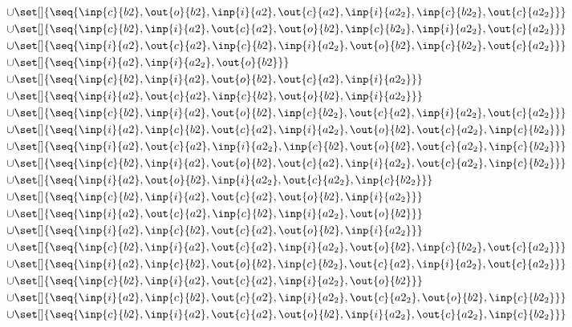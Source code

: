 \begin{align*}
\cup&\set[]{\seq{\inp{c}{b2},\out{o}{b2},\inp{i}{a2},\out{c}{a2},\inp{i}{a2_2},\inp{c}{b2_2},\out{c}{a2_2}}}\\
\cup&\set[]{\seq{\inp{c}{b2},\inp{i}{a2},\out{c}{a2},\out{o}{b2},\inp{c}{b2_2},\inp{i}{a2_2},\out{c}{a2_2}}}\\
\cup&\set[]{\seq{\inp{i}{a2},\out{c}{a2},\inp{c}{b2},\inp{i}{a2_2},\out{o}{b2},\inp{c}{b2_2},\out{c}{a2_2}}}\\
\cup&\set[]{\seq{\inp{i}{a2},\inp{i}{a2_2},\out{o}{b2}}}\\
\cup&\set[]{\seq{\inp{c}{b2},\inp{i}{a2},\out{o}{b2},\out{c}{a2},\inp{i}{a2_2}}}\\
\cup&\set[]{\seq{\inp{i}{a2},\out{c}{a2},\inp{c}{b2},\out{o}{b2},\inp{i}{a2_2}}}\\
\cup&\set[]{\seq{\inp{c}{b2},\inp{i}{a2},\out{o}{b2},\inp{c}{b2_2},\out{c}{a2},\inp{i}{a2_2},\out{c}{a2_2}}}\\
\cup&\set[]{\seq{\inp{i}{a2},\inp{c}{b2},\out{c}{a2},\inp{i}{a2_2},\out{o}{b2},\out{c}{a2_2},\inp{c}{b2_2}}}\\
\cup&\set[]{\seq{\inp{i}{a2},\out{c}{a2},\inp{i}{a2_2},\inp{c}{b2},\out{o}{b2},\out{c}{a2_2},\inp{c}{b2_2}}}\\
\cup&\set[]{\seq{\inp{c}{b2},\inp{i}{a2},\out{o}{b2},\out{c}{a2},\inp{i}{a2_2},\out{c}{a2_2},\inp{c}{b2_2}}}\\
\cup&\set[]{\seq{\inp{i}{a2},\out{o}{b2},\inp{i}{a2_2},\out{c}{a2_2},\inp{c}{b2_2}}}\\
\cup&\set[]{\seq{\inp{c}{b2},\inp{i}{a2},\out{c}{a2},\out{o}{b2},\inp{i}{a2_2}}}\\
\cup&\set[]{\seq{\inp{i}{a2},\out{c}{a2},\inp{c}{b2},\inp{i}{a2_2},\out{o}{b2}}}\\
\cup&\set[]{\seq{\inp{i}{a2},\inp{c}{b2},\out{c}{a2},\out{o}{b2},\inp{i}{a2_2}}}\\
\cup&\set[]{\seq{\inp{c}{b2},\inp{i}{a2},\out{c}{a2},\inp{i}{a2_2},\out{o}{b2},\inp{c}{b2_2},\out{c}{a2_2}}}\\
\cup&\set[]{\seq{\inp{i}{a2},\inp{c}{b2},\out{o}{b2},\inp{c}{b2_2},\out{c}{a2},\inp{i}{a2_2},\out{c}{a2_2}}}\\
\cup&\set[]{\seq{\inp{c}{b2},\inp{i}{a2},\out{c}{a2},\inp{i}{a2_2},\out{o}{b2}}}\\
\cup&\set[]{\seq{\inp{i}{a2},\inp{c}{b2},\out{c}{a2},\inp{i}{a2_2},\out{c}{a2_2},\out{o}{b2},\inp{c}{b2_2}}}\\
\cup&\set[]{\seq{\inp{c}{b2},\inp{i}{a2},\out{c}{a2},\out{o}{b2},\inp{i}{a2_2},\out{c}{a2_2},\inp{c}{b2_2}}}\\

\end{align*}
